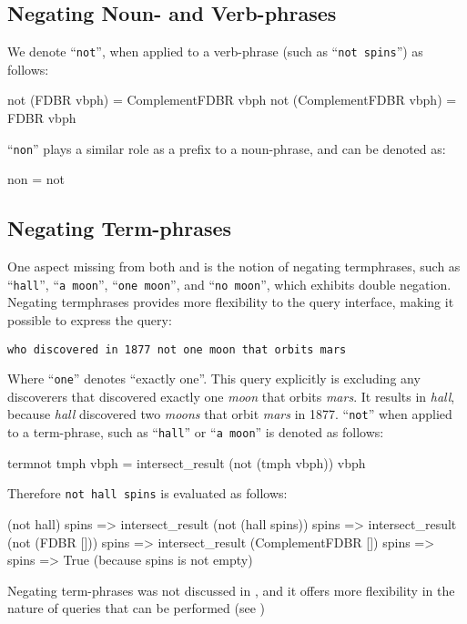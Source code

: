 \documentclass[../main.tex]{subfiles}
\begin{document}
\begin{refsection}
\subsection{Negating Noun- and Verb-phrases}

We denote ``\texttt{not}'', when applied to a verb-phrase (such as ``\texttt{not spins}'') as follows:
\begin{code}
    not (FDBR vbph) = ComplementFDBR vbph
    not (ComplementFDBR vbph) = FDBR vbph
\end{code}
``\texttt{non}'' plays a similar role as a prefix to a noun-phrase, and can be denoted as:
\begin{code}
    non = not
\end{code}

\subsection{Negating Term-phrases}

One aspect missing from both \cite{ferre2014squall} and \cite{frostboulos2002} is the notion
of negating termphrases, such as ``\texttt{hall}'', ``\texttt{a moon}'', ``\texttt{one moon}'', and ``\texttt{no moon}'', which exhibits double negation.  Negating termphrases provides more flexibility to the query interface, making it possible to express the query:

\begin{center}
	\texttt{who discovered in 1877 not one moon that orbits mars}
\end{center}
Where ``\texttt{one}'' denotes ``exactly one''.  This query explicitly is excluding any discoverers that discovered exactly one \textit{moon} that orbits \textit{mars}.  It results in \textit{hall}, because \textit{hall} discovered two \textit{moons} that orbit \textit{mars} in 1877.
``\texttt{not}'' when applied to a term-phrase, such as ``\texttt{hall}'' or ``\texttt{a moon}'' is denoted as follows:
\begin{code}
    termnot tmph vbph = intersect_result (not (tmph vbph)) vbph
\end{code}
Therefore \texttt{not hall spins} is evaluated as follows:
\begin{code}
       (not hall) spins
    => intersect_result (not (hall spins)) spins
    => intersect_result (not (FDBR [])) spins
    => intersect_result (ComplementFDBR []) spins
    => spins
    => True  (because spins is not empty)
\end{code}
Negating term-phrases was not discussed in \cite{frostboulos2002}, and it offers more flexibility
in the nature of queries that can be performed (see )



\end{refsection}
\end{document}

